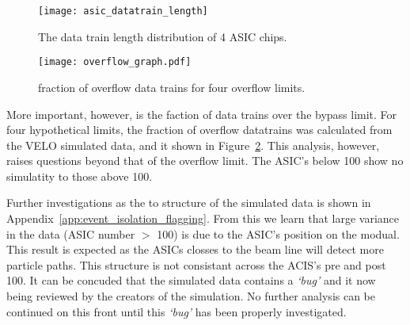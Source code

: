 		\begin{figure}[h]
			\centering
			\texttt{[image: asic\_datatrain\_length]}
			\caption{The data train length distribution of 4 ASIC chips.}
			\label{fig:asic_datatrain}
		\end{figure}
		\par
		\begin{figure}[h]
			\centering
			\texttt{[image: overflow\_graph.pdf]}
			\caption{fraction of overflow data trains for four overflow limits.}
			\label{fig:overflow_franction}
		\end{figure}
		More important, however, is the faction of data trains over the bypass limit.
		For four hypothetical limits, the fraction of overflow datatrains was calculated from the VELO simulated data, and it shown in Figure~\ref{fig:overflow_franction}.
		This analysis, however, raises questions beyond that of the overflow limit.
		The ASIC's below 100 show no simulatity to those above 100.
		\par
		Further investigations as the to structure of the simulated data is shown in Appendix~\ref{app:event_isolation_flagging}.
		From this we learn that large variance in the data (ASIC number $>$ 100) is due to the ASIC's position on the modual.
		This result is expected as the ASICs closses to the beam line will detect more particle paths.
		This structure is not consistant across the ACIS's pre and post 100.
		It can be concuded that the simulated data contains a \textit{`bug'} and it now being reviewed by the creators of the simulation. No further analysis can be continued on this front until this \textit{`bug'} has been properly investigated.


